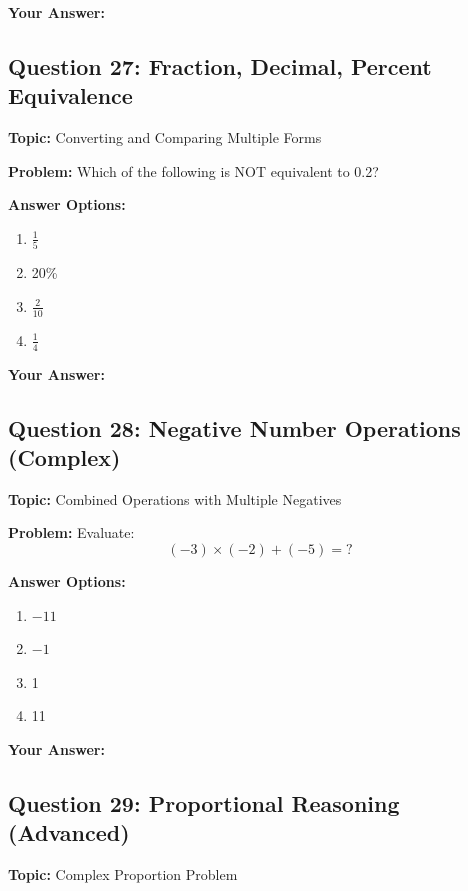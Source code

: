 \documentclass[12pt]{article}
\begin{document}
\noindent\textbf{Your Answer:} \underline{\hspace{2cm}}

\vspace{0.5cm}


\subsection{Question 27: Fraction, Decimal, Percent Equivalence}
\textbf{Topic:} Converting and Comparing Multiple Forms

\textbf{Problem:} Which of the following is NOT equivalent to 0.2?

\textbf{Answer Options:}
\begin{enumerate}[label=\Alph*)]
    \item $\frac{1}{5}$
    \item 20\%
    \item $\frac{2}{10}$
    \item $\frac{1}{4}$
\end{enumerate}

\noindent\textbf{Your Answer:} \underline{\hspace{2cm}}

\vspace{0.5cm}


\subsection{Question 28: Negative Number Operations (Complex)}
\textbf{Topic:} Combined Operations with Multiple Negatives

\textbf{Problem:} Evaluate:
\[(-3) \times (-2) + (-5) = ?\]

\textbf{Answer Options:}
\begin{enumerate}[label=\Alph*)]
    \item $-11$
    \item $-1$
    \item 1
    \item 11
\end{enumerate}

\noindent\textbf{Your Answer:} \underline{\hspace{2cm}}

\vspace{0.5cm}


\subsection{Question 29: Proportional Reasoning (Advanced)}
\textbf{Topic:} Complex Proportion Problem
\end{document}
